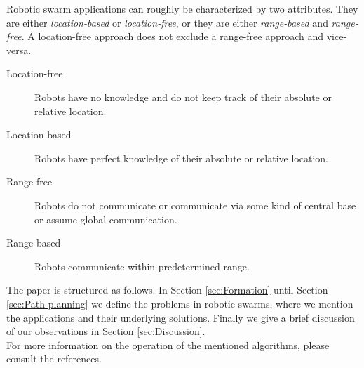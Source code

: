 Robotic swarm applications can roughly be characterized by two attributes. They are either \emph{location-based} or \emph{location-free}, or they are either \emph{range-based} and  \emph{range-free}. A location-free approach does not exclude a range-free approach and vice-versa.
\begin{description}
	\item[Location-free] Robots have no knowledge and do not keep track of their absolute or relative location.
	\item[Location-based] Robots have perfect knowledge of their absolute or relative location.
	\item[Range-free] Robots do not communicate or communicate via some kind of central base or assume global communication.
	\item[Range-based] Robots communicate within predetermined range.
\end{description}

The paper is structured as follows. 
In Section \ref{sec:Formation} until Section \ref{sec:Path-planning} we define the problems in robotic swarms, where we mention the applications and their underlying solutions.
Finally we give a brief discussion of our observations in Section \ref{sec:Discussion}.\\  


For more information on the operation of the mentioned algorithms, please consult the references. 

% 

